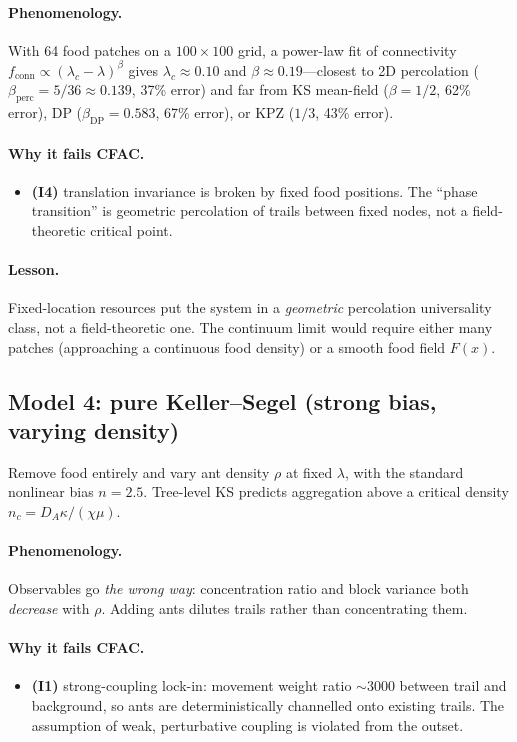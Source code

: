 \documentclass[10pt,a4paper,twocolumn]{article}
\theoremstyle{definition}
\begin{document}
\paragraph{Phenomenology.}
With 64 food patches on a $100 \times 100$ grid, a power-law
fit of connectivity $f_{\text{conn}} \propto
(\lambda_c-\lambda)^\beta$ gives $\lambda_c \approx 0.10$ and
$\beta \approx 0.19$---closest to 2D percolation
($\beta_{\text{perc}} = 5/36 \approx 0.139$, 37\% error) and
far from KS mean-field ($\beta = 1/2$, 62\% error), DP
($\beta_{\text{DP}} = 0.583$, 67\% error), or KPZ ($1/3$,
43\% error).

\paragraph{Why it fails CFAC.}
\begin{itemize}
  \item \textbf{(I4)} translation invariance is broken by fixed
    food positions.  The ``phase transition'' is geometric
    percolation of trails between fixed nodes, not a
    field-theoretic critical point.
\end{itemize}

\paragraph{Lesson.}
Fixed-location resources put the system in a \emph{geometric}
percolation universality class, not a field-theoretic one.
The continuum limit would require either many patches
(approaching a continuous food density) or a smooth food field
$F(x)$.

\subsection{Model 4: pure Keller--Segel (strong bias, varying density)}
Remove food entirely and vary ant density $\rho$ at fixed
$\lambda$, with the standard nonlinear bias $n = 2.5$.  Tree-level
KS predicts aggregation above a critical density $n_c = D_A
\kappa/(\chi\mu)$.

\paragraph{Phenomenology.}
Observables go \emph{the wrong way}: concentration ratio and
block variance both \emph{decrease} with $\rho$.  Adding ants
dilutes trails rather than concentrating them.

\paragraph{Why it fails CFAC.}
\begin{itemize}
  \item \textbf{(I1)} strong-coupling lock-in: movement weight
    ratio $\sim 3000$ between trail and background, so ants
    are deterministically channelled onto existing trails.
    The assumption of weak, perturbative coupling is violated
    from the outset.
\end{itemize}
\end{document}
